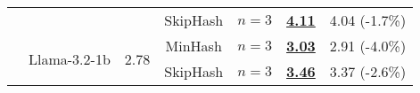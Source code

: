 \begin{table*}[t]
{\begin{tabular}{ccccccc}
        \cmidrule{4-7}
        & & & SkipHash & $n=3$ & \textbf{\underline{4.11}} & 4.04 \textcolor[rgb]{0.5,0.0,0.0}{(-1.7\%)}\\
        \cmidrule{2-7}
        & \multirow{2}{*}{Llama-3.2-1b} & \multirow{2}{*}{2.78} & MinHash & $n=3$ & \textbf{\underline{3.03}}  & 2.91 \textcolor[rgb]{0.5,0.0,0.0}{(-4.0\%)}\\
        \cmidrule{4-7}
        & & & SkipHash & $n=3$ & \textbf{\underline{3.46}} & 3.37 \textcolor[rgb]{0.5,0.0,0.0}{(-2.6\%)}\\
        \bottomrule
    \end{tabular}
    }
    \label{tab:knowledge_more_scheme}
\end{table*}